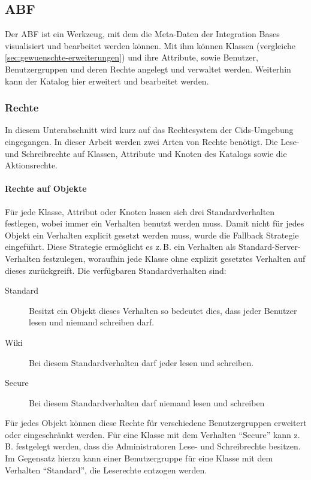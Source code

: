 \subsection{ABF}
Der \ac{ABF} ist ein Werkzeug, mit dem die Meta-Daten der Integration Bases visualisiert und bearbeitet werden können.
Mit ihm können Klassen (vergleiche \autoref{sec:gewuenschte-erweiterungen}) und ihre Attribute, sowie Benutzer, Benutzergruppen und deren Rechte angelegt und verwaltet werden.
Weiterhin kann der Katalog hier erweitert und bearbeitet werden.

\subsubsection{Rechte}
In diesem Unterabschnitt wird kurz auf das Rechtesystem der Cids-Umgebung eingegangen. In dieser Arbeit werden zwei Arten von Rechte benötigt. Die Lese- und Schreibrechte auf Klassen, Attribute und Knoten des Katalogs sowie die Aktionsrechte.

\paragraph{Rechte auf Objekte}
Für jede Klasse, Attribut oder Knoten lassen sich drei Standardverhalten festlegen, wobei immer ein Verhalten benutzt werden muss.
Damit nicht für jedes Objekt ein Verhalten explicit gesetzt werden muss, wurde die Fallback Strategie eingeführt.
Diese Strategie ermöglicht es z.\,B. ein Verhalten als Standard-Server-Verhalten festzulegen, woraufhin jede Klasse ohne explizit gesetztes Verhalten auf dieses zurückgreift.
Die verfügbaren Standardverhalten sind:
\begin{description}
\item[Standard] Besitzt ein Objekt dieses Verhalten so bedeutet dies, dass jeder Benutzer lesen und niemand schreiben darf.
\item[Wiki] Bei diesem Standardverhalten darf jeder lesen und schreiben.
\item[Secure] Bei diesem Standardverhalten darf niemand lesen und schreiben
\end{description}
Für jedes Objekt können diese Rechte für verschiedene Benutzergruppen erweitert oder eingeschränkt werden.
Für eine Klasse mit dem Verhalten "`Secure"' kann z.\,B. festgelegt werden, dass die Administratoren Lese- und Schreibrechte besitzen.
Im Gegensatz hierzu kann einer Benutzergruppe für eine Klasse mit dem Verhalten "`Standard"', die Leserechte entzogen werden. \autocite[vgl.][]{cismet-workshop}

